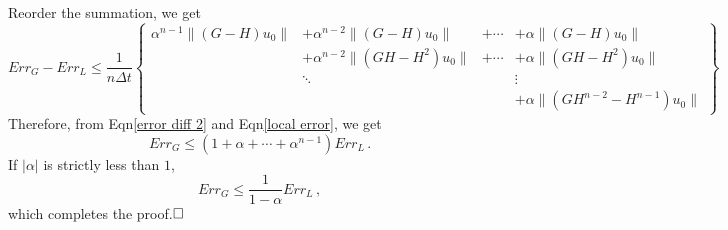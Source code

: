 \documentclass[a4paper,onecolumn]{article}
\theoremstyle{remark}
\begin{document}
    Reorder the summation, we get
    \begin{equation}
        Err_G - Err_L \le 
        \frac{1}{n\Delta t}
        \left\{\begin{split}
            \alpha^{n-1}\|(G - H)u_0\| &+ \alpha^{n-2}\|(G - H)u_0\|&+\cdots
            &+ \alpha\|(G - H)u_0\|\\
            &+\alpha^{n-2}\|( GH - H^2)u_0\| &+ \cdots 
            &+ \alpha\|(GH - H^{2})u_0\|\\
            &\ddots&& \vdots\\
            &&& + \alpha\|(GH^{n-2} - H^{n-1})u_0\|
        \end{split}
        \right\}
        \label{error diff 2}
    \end{equation}
    Therefore, from Eqn\eqref{error diff 2} and Eqn\eqref{local error}, we get
    \begin{equation}
        Err_G \le (1+\alpha+\cdots+\alpha^{n-1}) Err_L\,.
    \end{equation}
    If $|\alpha|$ is strictly less than $1$, 
    \begin{equation}
        Err_G \le \frac{1}{1-\alpha} Err_L\,,
    \end{equation}
    which completes the proof.$\hfill\Box$



\end{document}
